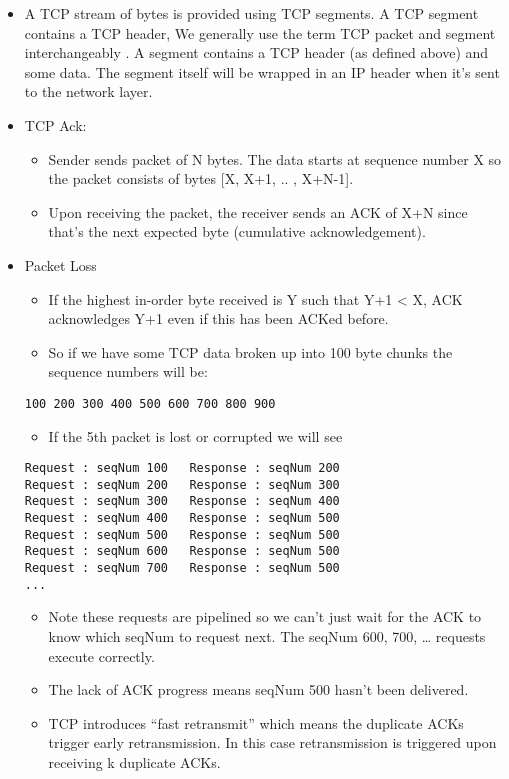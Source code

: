 \begin{itemize}
\tightlist
\item
  A TCP stream of bytes is provided using TCP segments. A TCP segment
  contains a TCP header, We generally use the term TCP packet and
  segment interchangeably . A segment contains a TCP header (as defined
  above) and some data. The segment itself will be wrapped in an IP
  header when it's sent to the network layer.
\item
  TCP Ack:

  \begin{itemize}
  \tightlist
  \item
    Sender sends packet of N bytes. The data starts at sequence number X
    so the packet consists of bytes {[}X, X+1, .. , X+N-1{]}.
  \item
    Upon receiving the packet, the receiver sends an ACK of X+N since
    that's the next expected byte (cumulative acknowledgement).
  \end{itemize}
\item
  Packet Loss

  \begin{itemize}
  \tightlist
  \item
    If the highest in-order byte received is Y such that Y+1 \textless{}
    X, ACK acknowledges Y+1 even if this has been ACKed before.
  \item
    So if we have some TCP data broken up into 100 byte chunks the
    sequence numbers will be:
  \end{itemize}

\begin{verbatim}
100 200 300 400 500 600 700 800 900 
\end{verbatim}

  \begin{itemize}
  \tightlist
  \item
    If the 5th packet is lost or corrupted we will see
  \end{itemize}

\begin{verbatim}
Request : seqNum 100   Response : seqNum 200 
Request : seqNum 200   Response : seqNum 300 
Request : seqNum 300   Response : seqNum 400
Request : seqNum 400   Response : seqNum 500 
Request : seqNum 500   Response : seqNum 500 
Request : seqNum 600   Response : seqNum 500 
Request : seqNum 700   Response : seqNum 500 
...  
\end{verbatim}

  \begin{itemize}
  \tightlist
  \item
    Note these requests are pipelined so we can't just wait for the ACK
    to know which seqNum to request next. The seqNum 600, 700, \ldots{}
    requests execute correctly.
  \item
    The lack of ACK progress means seqNum 500 hasn't been delivered.
  \item
    TCP introduces ``fast retransmit'' which means the duplicate ACKs
    trigger early retransmission. In this case retransmission is
    triggered upon receiving k duplicate ACKs.


\end{itemize}
\end{itemize}
